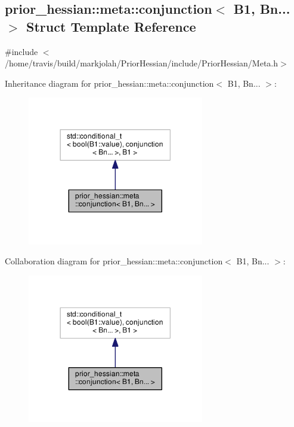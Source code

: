 \hypertarget{structprior__hessian_1_1meta_1_1conjunction_3_01B1_00_01Bn_8_8_8_01_4}{}\subsection{prior\+\_\+hessian\+:\+:meta\+:\+:conjunction$<$ B1, Bn... $>$ Struct Template Reference}
\label{structprior__hessian_1_1meta_1_1conjunction_3_01B1_00_01Bn_8_8_8_01_4}


{\ttfamily \#include $<$/home/travis/build/markjolah/\+Prior\+Hessian/include/\+Prior\+Hessian/\+Meta.\+h$>$}



Inheritance diagram for prior\+\_\+hessian\+:\+:meta\+:\+:conjunction$<$ B1, Bn... $>$\+:\nopagebreak
\begin{figure}[H]
\begin{center}
\leavevmode
\includegraphics[width=218pt]{structprior__hessian_1_1meta_1_1conjunction_3_01B1_00_01Bn_8_8_8_01_4__inherit__graph}
\end{center}
\end{figure}


Collaboration diagram for prior\+\_\+hessian\+:\+:meta\+:\+:conjunction$<$ B1, Bn... $>$\+:\nopagebreak
\begin{figure}[H]
\begin{center}
\leavevmode
\includegraphics[width=218pt]{structprior__hessian_1_1meta_1_1conjunction_3_01B1_00_01Bn_8_8_8_01_4__coll__graph}
\end{center}
\end{figure}


